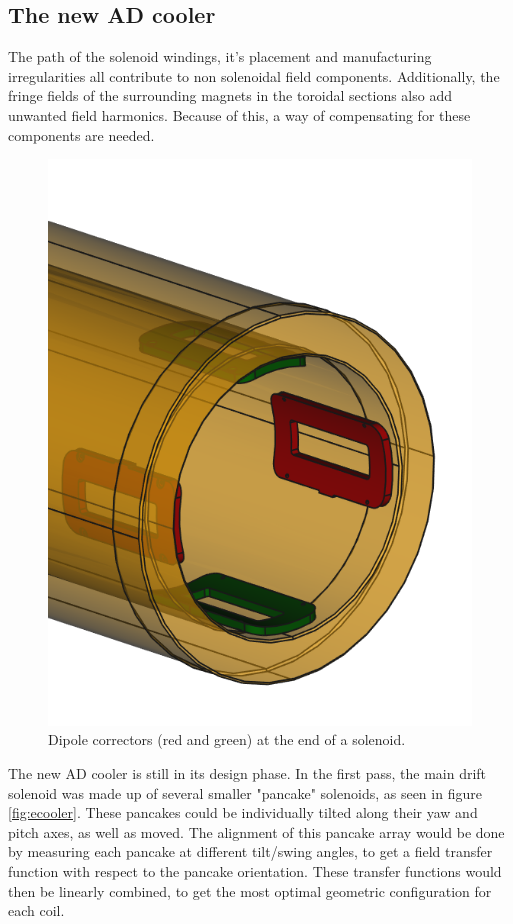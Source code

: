 \subsection{The new AD cooler}
The path of the solenoid windings, it's placement and manufacturing
irregularities all contribute to non solenoidal field components.
Additionally, the fringe fields of the surrounding magnets in the
toroidal sections also add unwanted field harmonics. Because of this,
a way of compensating for these components are needed.

\begin{figure}
    \includegraphics[width=0.9\linewidth]{figs/dipolecorrectors}
    \caption{Dipole correctors (red and green) at the end of a
        solenoid.}
    \label{fig:dipolecorrectors}
\end{figure}

The new AD cooler is still in its design phase. In the first pass,
the main drift solenoid was made up of several smaller "pancake"
solenoids, as seen in figure \ref{fig:ecooler}. These pancakes could
be individually tilted along their yaw and pitch axes, as well as moved.
The alignment of this pancake array would be done by measuring each
pancake at different tilt/swing angles, to get a field transfer function
with respect to the pancake orientation. These transfer functions would
then be linearly combined, to get the most optimal geometric configuration
for each coil.

